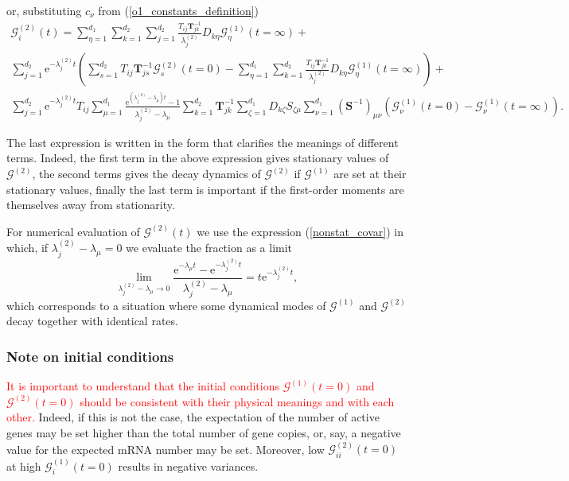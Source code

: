 \documentclass[a4paper, 11pt]{article}
\begin{document}
or, substituting $c_\nu$ from (\ref{o1_constants_definition})
\begin{multline}
  \mathcal G^{(2)}_i(t) = \sum_{\eta=1}^{d_1}\sum_{k=1}^{d_2}\sum_{j=1}^{d_2}\frac{T_{ij}\mathbf T^{-1}_{jk}}{\lambda^{(2)}_j}D_{k\eta}\mathcal G_\eta^{(1)}(t=\infty) +\\
  \sum_{j=1}^{d_2}\mathrm e^{-\lambda^{(2)}_jt}\left(\sum_{s=1}^{d_2}T_{ij}\mathbf T^{-1}_{js}\mathcal G^{(2)}_s(t=0) - \sum_{\eta=1}^{d_1}\sum_{k=1}^{d_2}\frac{T_{ij}\mathbf T^{-1}_{jk}}{\lambda^{(2)}_j}D_{k\eta}\mathcal G_\eta^{(1)}(t=\infty)\right) +\\
  \sum_{j=1}^{d_2}\mathrm e^{-\lambda^{(2)}_jt}T_{ij}\sum_{\mu=1}^{d_1}\frac{\mathrm e^{(\lambda^{(2)}_j-\lambda_\mu)t}-1}{\lambda^{(2)}_j-\lambda_\mu}\sum_{k=1}^{d_2}\mathbf T^{-1}_{jk}\sum_{\zeta=1}^{d_1}D_{k\zeta}S_{\zeta\mu}\sum_{\nu=1}^{d_1}(\mathbf S^{-1})_{\mu\nu}\left(\mathcal G_\nu^{(1)}(t=0) - \mathcal G_\nu^{(1)}(t=\infty)\right).
\end{multline}

The last expression is written in the form that clarifies the meanings of different terms. Indeed, the first term in the above expression gives stationary values of $\boldsymbol{\mathcal G}^{(2)}$, the second terms gives the decay dynamics of $\boldsymbol{\mathcal G}^{(2)}$ if $\boldsymbol{\mathcal G}^{(1)}$ are set at their stationary values, finally the last term is important if the first-order moments are themselves away from stationarity.

For numerical evaluation of $\boldsymbol{\mathcal G}^{(2)}(t)$ we use the expression (\ref{nonstat_covar}) in which, if $\lambda^{(2)}_j-\lambda_\mu=0$ we evaluate the fraction as a limit
\begin{equation}
  \lim_{\lambda^{(2)}_j-\lambda_\mu\to 0}\frac{\mathrm e^{-\lambda_\mu t}-\mathrm e^{-\lambda^{(2)}_jt}}{\lambda^{(2)}_j-\lambda_\mu} = t\mathrm e^{-\lambda^{(2)}_jt},
\end{equation}
which corresponds to a situation where some dynamical modes of $\boldsymbol{\mathcal G}^{(1)}$ and $\boldsymbol{\mathcal G}^{(2)}$ decay together with identical rates.

\subsubsection{Note on initial conditions}
\textcolor{red}{It is important to understand that the initial conditions $\boldsymbol{\mathcal G}^{(1)}(t=0)$ and $\boldsymbol{\mathcal G}^{(2)}(t=0)$ should be consistent with their physical meanings and with each other.} Indeed, if this is not the case, the expectation of the number of active genes may be set higher than the total number of gene copies, or, say, a negative value for the expected mRNA number may be set. Moreover, low $\mathcal G_{ii}^{(2)}(t=0)$ at high $\mathcal G_i^{(1)}(t=0)$ results in negative variances.
\end{document}
